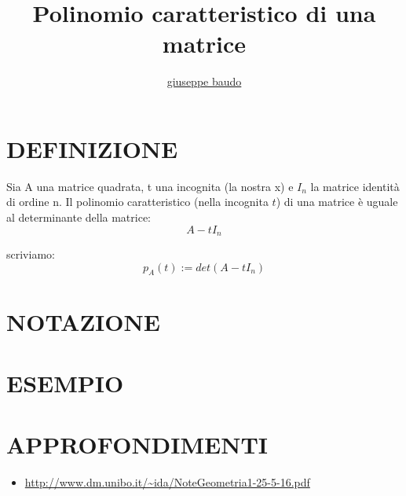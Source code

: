 \documentclass[a4paper,10pt]{article}
\title{Polinomio caratteristico di una matrice}
\author{\href{http://www.baudo.hol.es}{giuseppe baudo}}
\begin{document}
\maketitle

\section{DEFINIZIONE}
Sia A una matrice quadrata, t una incognita (la nostra x) e $I_n$ la matrice identità di ordine n. Il polinomio caratteristico (nella incognita $t$) di una matrice è uguale al determinante della matrice:
\[
 A-tI_n
\]

scriviamo:
\[
 p_A(t) := det(A-tI_n)
\]

\section{NOTAZIONE}

\section{ESEMPIO}

\section{APPROFONDIMENTI}
\begin{itemize}
 \item \url{http://www.dm.unibo.it/~ida/NoteGeometria1-25-5-16.pdf}
\end{itemize}
\end{document}
